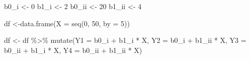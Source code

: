 \documentclass[
]{book}
\newenvironment{Shaded}{\begin{snugshade}}{\end{snugshade}}
\newcommand{\AttributeTok}[1]{\textcolor[rgb]{0.77,0.63,0.00}{#1}}
\newcommand{\DecValTok}[1]{\textcolor[rgb]{0.00,0.00,0.81}{#1}}
\newcommand{\FunctionTok}[1]{\textcolor[rgb]{0.00,0.00,0.00}{#1}}
\newcommand{\NormalTok}[1]{#1}
\newcommand{\OtherTok}[1]{\textcolor[rgb]{0.56,0.35,0.01}{#1}}
\newcommand{\SpecialCharTok}[1]{\textcolor[rgb]{0.00,0.00,0.00}{#1}}
\begin{document}
\begin{Shaded}
\begin{Highlighting}[]
\NormalTok{b0\_i }\OtherTok{\textless{}{-}} \DecValTok{0}
\NormalTok{b1\_i }\OtherTok{\textless{}{-}} \DecValTok{2}
\NormalTok{b0\_ii }\OtherTok{\textless{}{-}} \DecValTok{20}
\NormalTok{b1\_ii }\OtherTok{\textless{}{-}} \DecValTok{4}

\NormalTok{df }\OtherTok{\textless{}{-}}\FunctionTok{data.frame}\NormalTok{(}\AttributeTok{X =} \FunctionTok{seq}\NormalTok{(}\DecValTok{0}\NormalTok{, }\DecValTok{50}\NormalTok{, }\AttributeTok{by =} \DecValTok{5}\NormalTok{))}

\NormalTok{df }\OtherTok{\textless{}{-}}\NormalTok{ df }\SpecialCharTok{\%\textgreater{}\%} 
  \FunctionTok{mutate}\NormalTok{(}\AttributeTok{Y1 =}\NormalTok{ b0\_i }\SpecialCharTok{+}\NormalTok{ b1\_i }\SpecialCharTok{*}\NormalTok{ X,}
         \AttributeTok{Y2 =}\NormalTok{ b0\_i }\SpecialCharTok{+}\NormalTok{ b1\_ii }\SpecialCharTok{*}\NormalTok{ X,}
         \AttributeTok{Y3 =}\NormalTok{ b0\_ii }\SpecialCharTok{+}\NormalTok{ b1\_i }\SpecialCharTok{*}\NormalTok{ X,}
         \AttributeTok{Y4 =}\NormalTok{ b0\_ii }\SpecialCharTok{+}\NormalTok{ b1\_ii }\SpecialCharTok{*}\NormalTok{ X)}


\end{Highlighting}
\end{Shaded}
\end{document}
